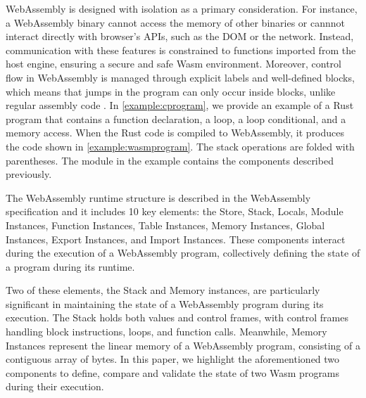 WebAssembly is designed with isolation as a primary consideration. For instance, a WebAssembly binary cannot access the memory of other binaries or cannnot interact directly with browser's APIs, such as the DOM or the network. Instead, communication with these features is constrained to functions imported from the host engine, ensuring a secure and safe Wasm environment.
Moreover, control flow in WebAssembly is managed through explicit labels and well-defined blocks, which means that jumps in the program can only occur inside blocks, unlike regular assembly code \cite{10.1145/3062341.3062363}. 
In \autoref{example:cprogram}, we provide an example of a Rust program that contains a function declaration, a loop, a loop conditional, and a memory access. When the Rust code is compiled to WebAssembly, it produces the code shown in \autoref{example:wasmprogram}. The stack operations are folded with parentheses.
The module in the example contains the components described previously.


The WebAssembly runtime structure is described in the WebAssembly specification and it includes 10 key elements: the Store, Stack, Locals, Module Instances, Function Instances, Table Instances, Memory Instances, Global Instances, Export Instances, and Import Instances. These components interact during the execution of a WebAssembly program, collectively defining the state of a program during its runtime.

Two of these elements, the Stack and Memory instances, are particularly significant in maintaining the state of a WebAssembly program during its execution. The Stack holds both values and control frames, with control frames handling block instructions, loops, and function calls. Meanwhile, Memory Instances represent the linear memory of a WebAssembly program, consisting of a contiguous array of bytes.
In this paper, we highlight the aforementioned two components to define, compare and validate the state of two Wasm programs during their execution. 

\label{background:wasm:memory}
\label{background:wasm:execution}




